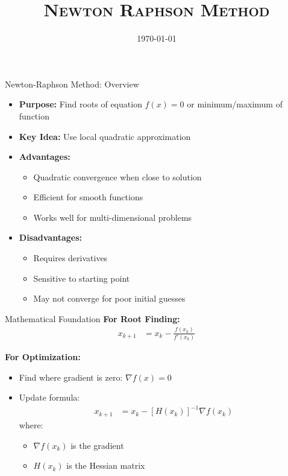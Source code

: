 \documentclass[10pt]{beamer}
\title{\textsc{Newton Raphson Method}}
\date{\today}
\author[Short Name (U ABC)]{%
  \texorpdfstring{%
    \begin{columns}
      \column{\linewidth}
      Swapnil Singh \\ Bank of Lithuania, KTU
    \end{columns}
 }
 {Anu Alexander, Nancy Luke, Kaivan Munshi, Swapnil Singh}
}
\theoremstyle{plain}%
\theoremstyle{definition}
\theoremstyle{remark}
\begin{document}
\begin{frame}
    \titlepage
\end{frame}



\begin{frame}{Newton-Raphson Method: Overview}
    \begin{itemize}
        \item \textbf{Purpose:} Find roots of equation $f(x) = 0$ or minimum/maximum of function
        \item \textbf{Key Idea:} Use local quadratic approximation
        \item \textbf{Advantages:}
        \begin{itemize}
            \item Quadratic convergence when close to solution
            \item Efficient for smooth functions
            \item Works well for multi-dimensional problems
        \end{itemize}
        \item \textbf{Disadvantages:}
        \begin{itemize}
            \item Requires derivatives
            \item Sensitive to starting point
            \item May not converge for poor initial guesses
        \end{itemize}
    \end{itemize}
\end{frame}

\begin{frame}{Mathematical Foundation}
    \textbf{For Root Finding:}
    \begin{align*}
        x_{k+1} &= x_k - \frac{f(x_k)}{f'(x_k)}
    \end{align*}
    
    \textbf{For Optimization:}
    \begin{itemize}
        \item Find where gradient is zero: $\nabla f(x) = 0$
        \item Update formula:
        \begin{align*}
            x_{k+1} &= x_k - [H(x_k)]^{-1}\nabla f(x_k)
        \end{align*}
        where:
        \begin{itemize}
            \item $\nabla f(x_k)$ is the gradient
            \item $H(x_k)$ is the Hessian matrix
        \end{itemize}
    \end{itemize}
\end{frame}
\end{document}
